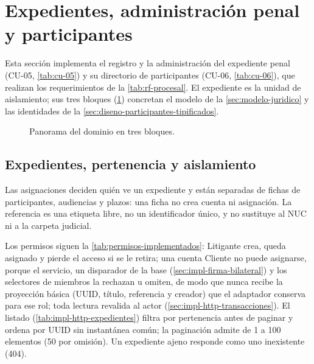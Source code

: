
\section{Expedientes, administración penal y participantes}\label{sec:impl-expedientes}

Esta sección implementa el registro y la administración del expediente penal (CU-05, \cref{tab:cu-05}) y su directorio de participantes (CU-06, \cref{tab:cu-06}), que realizan los requerimientos de la \cref{tab:rf-procesal}. El expediente es la unidad de aislamiento; sus tres bloques (\cref{fig:impl-exp-panorama}) concretan el modelo de la \cref{sec:modelo-juridico} y las identidades de la \cref{sec:diseno-participantes-tipificados}.

\begin{figure}[!htbp]
  \centering
  
  \caption{Panorama del dominio en tres bloques.}
  \label{fig:impl-exp-panorama}
\end{figure}

\subsection{Expedientes, pertenencia y aislamiento}\label{sec:impl-http-expedientes}

Las asignaciones deciden quién ve un expediente y están separadas de fichas de participantes, audiencias y plazos: una ficha no crea cuenta ni asignación. La referencia es una etiqueta libre, no un identificador único, y no sustituye al NUC ni a la carpeta judicial.

Los permisos siguen la \cref{tab:permisos-implementados}: Litigante crea, queda asignado y pierde el acceso si se le retira; una cuenta Cliente no puede asignarse, porque el servicio, un disparador de la base (\cref{sec:impl-firma-bilateral}) y los selectores de miembros la rechazan u omiten, de modo que nunca recibe la proyección básica (UUID, título, referencia y creador) que el adaptador conserva para ese rol; toda lectura revalida al actor (\cref{sec:impl-http-transacciones}). El listado (\cref{tab:impl-http-expedientes}) filtra por pertenencia antes de paginar y ordena por UUID sin instantánea común; la paginación admite de 1 a 100 elementos (50 por omisión). Un expediente ajeno responde como uno inexistente (404).

